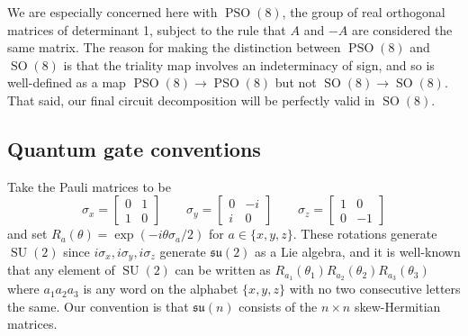 \documentclass[reqno]{amsart}
\theoremstyle{definition} \newtheorem{example}[theorem]{Example}
\newcommand{\SU}{\operatorname{SU}}
\newcommand{\SO}{\operatorname{SO}}
\newcommand{\PSO}{\operatorname{PSO}}
\newcommand{\su}{\mathfrak{su}}
\begin{document}
We are especially concerned here with $\PSO(8)$, the group of real orthogonal matrices of determinant 1, subject to the rule that $A$ and $-A$ are considered the same matrix. The reason for making the distinction between $\PSO(8)$ and $\SO(8)$ is that the triality map involves an indeterminacy of sign, and so is well-defined as a map $\PSO(8) \to \PSO(8)$ but not $\SO(8) \to \SO(8)$. That said, our final circuit decomposition will be perfectly valid in $\SO(8)$.

\subsection{Quantum gate conventions}
Take the Pauli matrices to be
\begin{equation*}
\sigma_x = \begin{bmatrix} 0 & 1 \\ 1 & 0 \end{bmatrix} \qquad \sigma_y = \begin{bmatrix} 0 & -i \\ i & 0 \end{bmatrix} \qquad \sigma_z = \begin{bmatrix} 1 & 0 \\ 0 & -1 \end{bmatrix}
\end{equation*}
and set $R_a(\theta) = \exp(-i\theta\sigma_a/2)$ for $a \in \{x,y,z\}$. These rotations generate $\SU(2)$ since $i\sigma_x, i\sigma_y, i\sigma_z$ generate $\su(2)$ as a Lie algebra, and it is well-known that any element of $\SU(2)$ can be written as $R_{a_1}(\theta_1)R_{a_2}(\theta_2)R_{a_3}(\theta_3)$ where $a_1 a_2 a_3$ is any word on the alphabet $\{x,y,z\}$ with no two consecutive letters the same. Our convention is that $\su(n)$ consists of the $n \times n$ skew-Hermitian matrices.
\end{document}
